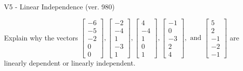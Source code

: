 \begin{exercise}
  \begin{exerciseTitle}V5 - Linear Independence (ver. 980)\end{exerciseTitle}
  \begin{exerciseStatement}
    Explain why the vectors \(\left[\begin{array}{r}
-6 \\
-5 \\
-2 \\
0 \\
0
\end{array}\right] , \left[\begin{array}{r}
-2 \\
-4 \\
1 \\
-3 \\
1
\end{array}\right] , \left[\begin{array}{r}
4 \\
-4 \\
1 \\
0 \\
1
\end{array}\right] , \left[\begin{array}{r}
-1 \\
0 \\
-3 \\
2 \\
4
\end{array}\right] , \text{ and } \left[\begin{array}{r}
5 \\
2 \\
-1 \\
-2 \\
-1
\end{array}\right]\) are linearly dependent or linearly independent.	



\end{exerciseStatement}
\end{exercise}
